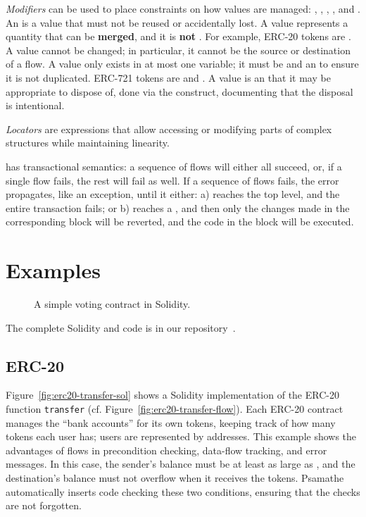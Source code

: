 \documentclass[nonacm, dvipsnames, sigconf]{acmart}
\begin{document}
\emph{Modifiers} can be used to place constraints on how values are managed: , , , , and .
An  is a value that must not be reused or accidentally lost.
A  value represents a quantity that can be \textbf{merged}, and it is \textbf{not} .
For example, ERC-20 tokens are .
A  value cannot be changed; in particular, it cannot be the source or destination of a flow.
A  value only exists in at most one variable; it must be  and an  to ensure it is not duplicated.
ERC-721 tokens are  and .
A  value is an  that it may be appropriate to dispose of, done via the  construct, documenting that the disposal is intentional.

\emph{Locators} are expressions that allow accessing or modifying parts of complex structures while maintaining linearity.

\langName has transactional semantics: a sequence of flows will either all succeed, or, if a single flow fails, the rest will fail as well.
If a sequence of flows fails, the error propagates, like an exception, until it either: a) reaches the top level, and the entire transaction fails; or b) reaches a , and then only the changes made in the corresponding  block will be reverted, and the code in the  block will be executed.

\section{Examples}
\begin{figure}
    \centering
    
    \vspace{-1em}
    \caption{A simple voting contract in Solidity.}
    \label{fig:voting-impl-sol}
\end{figure}
The complete Solidity and \langName code is in our repository~\cite{psamatheRepo}.

\subsection{ERC-20}\label{sec:erc20-impl}
Figure~\ref{fig:erc20-transfer-sol} shows a Solidity implementation of the ERC-20 function \lstinline{transfer} (cf. Figure~\ref{fig:erc20-transfer-flow}).
Each ERC-20 contract manages the ``bank accounts'' for its own tokens, keeping track of how many tokens each user has; users are represented by addresses.
This example shows the advantages of flows in precondition checking, data-flow tracking, and error messages.
In this case, the sender's balance must be at least as large as , and the destination's balance must not overflow when it receives the tokens.
Psamathe automatically inserts code checking these two conditions, ensuring that the checks are not forgotten.
\end{document}

